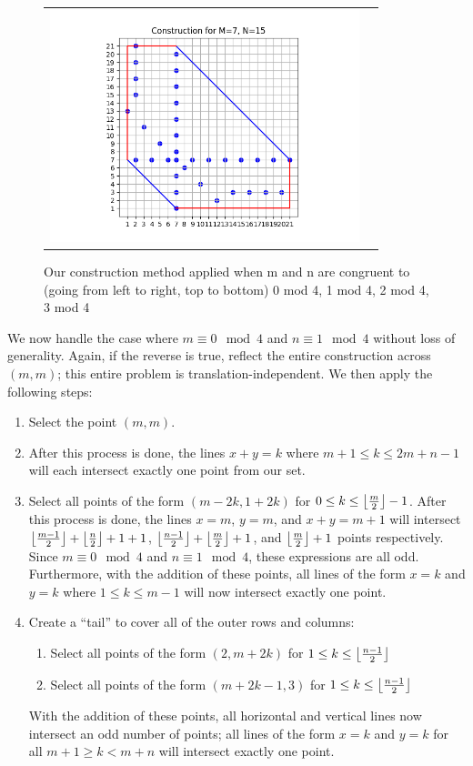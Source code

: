 \documentclass[10pt]{../usamts}
\begin{document}
\begin{solution}
\begin{figure}[htbp]
\begin{tabular}{c c}
    \includegraphics[width=9cm]{round2/p5construct/construct_7_15.png}\\
    \end{tabular}
    \caption{Our construction method applied when m and n are congruent to (going from left to right, top to bottom) 0 mod 4, 1 mod 4, 2 mod 4, 3 mod 4}
    \label{fig:congconstruct}
\end{figure}

\clearpage
We now handle the case where $m \equiv 0 \mod 4$ and $n \equiv 1 \mod 4$ without loss of generality. Again, if the reverse is true, reflect the entire construction across $(m,m)$; this entire problem is translation-independent. We then apply the following steps:

\begin{enumerate}
    \item Select the point $(m,m)$.
    \item \mainaxis
    After this process is done, the lines $x+y = k$ where $m+1 \leq k \leq 2m+n-1$ will each intersect exactly one point from our set.
    \item Select all points of the form $(m-2k, 1+2k)$ for $0 \leq k \leq \left\lfloor \frac{m}{2} \right\rfloor-1$.
    After this process is done, the lines $x=m$, $y=m$, and $x+y = m+1$ will intersect $\left\lfloor \frac{m-1}{2} \right\rfloor + \left\lfloor \frac{n}{2} \right\rfloor + 1 + 1$, $\left\lfloor \frac{n-1}{2} \right\rfloor + \left\lfloor \frac{m}{2} \right\rfloor + 1$, and $\left\lfloor \frac{m}{2} \right\rfloor + 1$ points respectively. Since $m \equiv 0 \mod 4$ and $n \equiv 1 \mod 4$, these expressions are all odd. Furthermore, with the addition of these points, all lines of the form $x=k$ and $y=k$ where $1 \leq k \leq m-1$ will now intersect exactly one point.
    \item Create a ``tail'' to cover all of the outer rows and columns:
    \begin{enumerate}
        \item Select all points of the form $(2, m+2k)$ for $1 \leq k \leq \left\lfloor \frac{n-1}{2} \right\rfloor$
        \item Select all points of the form $(m+2k-1, 3)$ for $1 \leq k \leq \left\lfloor \frac{n-1}{2} \right\rfloor$
    \end{enumerate}
    With the addition of these points, all horizontal and vertical lines now intersect an odd number of points; all lines of the form $x = k$ and $y=k$ for all $m+1 \geq k < m+n$ will intersect exactly one point.
    

\end{enumerate}
\end{solution}
\end{document}
